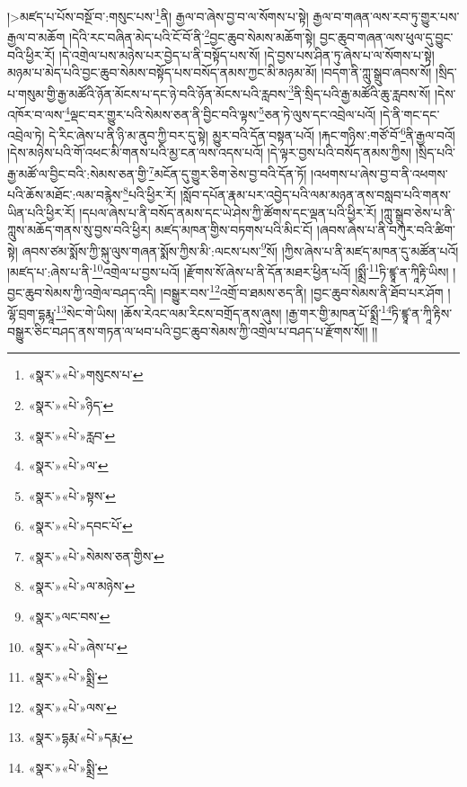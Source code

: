 །>མཛད་པ་པོས་བསྔོ་བ་:གསུང་པས་\footnote{«སྣར་»«པེ་»གསུངས་པ་}ནི། རྒྱལ་བ་ཞེས་བྱ་བ་ལ་སོགས་པ་སྟེ། རྒྱལ་བ་གཞན་ལས་རབ་ཏུ་གྱུར་པས་རྒྱལ་བ་མཆོག །དེའི་རང་བཞིན་མེད་པའི་ངོ་བོ་ནི་\footnote{«སྣར་»«པེ་»ཉིད་}བྱང་ཆུབ་སེམས་མཆོག་སྟེ། བྱང་ཆུབ་གཞན་ལས་ཕུལ་དུ་བྱུང་བའི་ཕྱིར་རོ། །དེ་འགྲེལ་པས་མཉེས་པར་བྱེད་པ་ནི་བསྟོད་པས་སོ། །དེ་བྱས་པས་ཤིན་ཏུ་ཞེས་པ་ལ་སོགས་པ་སྟེ། མཉམ་པ་མེད་པའི་བྱང་ཆུབ་སེམས་བསྟོད་པས་བསོད་ནམས་ཀྱང་མི་མཉམ་མོ། །བདག་ནི་ཀླུ་སྒྲུབ་ཞབས་སོ། །སྲིད་པ་གསུམ་གྱི་རྒྱ་མཚོའི་ཉོན་མོངས་པ་དང་ཉེ་བའི་ཉོན་མོངས་པའི་རླབས་\footnote{«སྣར་»«པེ་»རླབ་}ནི་སྲིད་པའི་རྒྱ་མཚོའི་ཆུ་རླབས་སོ། །དེས་འཁོར་བ་ལས་\footnote{«སྣར་»«པེ་»ལ་}ལྡང་བར་གྱུར་པའི་སེམས་ཅན་ནི་བྱིང་བའི་ལྟས་\footnote{«སྣར་»«པེ་»སྟས་}ཅན་ཏེ་ལུས་དང་འབྲེལ་པའོ། །དེ་ནི་གང་དང་འབྲེལ་ཏེ། དེ་རིང་ཞེས་པ་ནི་ཉི་མ་ནུབ་ཀྱི་བར་དུ་སྟེ། མྱུར་བའི་དོན་བསྟན་པའོ། །རྐང་གཉིས་:གཙོ་བོ་\footnote{«སྣར་»«པེ་»དབང་པོ་}ནི་རྒྱལ་བའོ། །དེས་མཉེས་པའི་གོ་འཕང་མི་གནས་པའི་མྱ་ངན་ལས་འདས་པའོ། །དེ་ལྟར་བྱས་པའི་བསོད་ནམས་ཀྱིས། །སྲིད་པའི་རྒྱ་མཚོ་ལ་བྱིང་བའི་:སེམས་ཅན་གྱི་\footnote{«སྣར་»«པེ་»སེམས་ཅན་གྱིས་}མངོན་དུ་གྱུར་ཅིག་ཅེས་བྱ་བའི་དོན་ཏོ། །འཕགས་པ་ཞེས་བྱ་བ་ནི་འཕགས་པའི་ཆོས་མཐོང་:ལམ་བརྙེས་\footnote{«སྣར་»«པེ་»ལ་མཉེས་}པའི་ཕྱིར་རོ། །སློབ་དཔོན་རྣམ་པར་འབྱེད་པའི་ལམ་མཉན་ནས་བསླབ་པའི་གནས་ཡིན་པའི་ཕྱིར་རོ། །དཔལ་ཞེས་པ་ནི་བསོད་ནམས་དང་ཡེ་ཤེས་ཀྱི་ཚོགས་དང་ལྡན་པའི་ཕྱིར་རོ། །ཀླུ་སྒྲུབ་ཅེས་པ་ནི་ཀླུས་མཆོད་གནས་སུ་བྱས་བའི་ཕྱིར། མཛད་མཁན་གྱིས་བཏགས་པའི་མིང་ངོ། །ཞབས་ཞེས་པ་ནི་བཀུར་བའི་ཚིག་སྟེ། ཞབས་ཙམ་སྨོས་ཀྱི་སྐུ་ལུས་གཞན་སྨོས་ཀྱིས་མི་:ལངས་པས་\footnote{«སྣར་»ལང་བས་}སོ། །ཀྱིས་ཞེས་པ་ནི་མཛད་མཁན་དུ་མཚོན་པའོ། །མཛད་པ་:ཞེས་པ་ནི་\footnote{«སྣར་»«པེ་»ཞེས་པ་}འགྲེལ་པ་བྱས་པའོ། །རྫོགས་སོ་ཞེས་པ་ནི་དོན་མཐར་ཕྱིན་པའོ། །སྨྲྀ་\footnote{«སྣར་»«པེ་»སྨྲི་}ཏི་ཛྙཱ་ན་ཀཱིརྟི་ཡིས། །བྱང་ཆུབ་སེམས་ཀྱི་འགྲེལ་བཤད་འདི། །བསྒྱུར་བས་\footnote{«སྣར་»«པེ་»ལས་}འགྲོ་བ་ཐམས་ཅད་ནི། །བྱང་ཆུབ་སེམས་ནི་ཐོབ་པར་ཤོག །ལྷོ་བྲག་དྷརྨཱ་\footnote{«སྣར་»དྷརྨ་«པེ་»དརྨ་}སེང་གེ་ཡིས། །ཆོས་རེའང་ལམ་རིངས་བགྲོད་ནས་ཞུས། །རྒྱ་གར་གྱི་མཁན་པོ་སྨྲྀ་\footnote{«སྣར་»«པེ་»སྨྲི་}ཏི་ཛྙཱ་ན་ཀཱི་རྟིས་བསྒྱུར་ཅིང་བཤད་ནས་གཏན་ལ་ཕབ་པའི་བྱང་ཆུབ་སེམས་ཀྱི་འགྲེལ་པ་བཤད་པ་རྫོགས་སོ།། །།